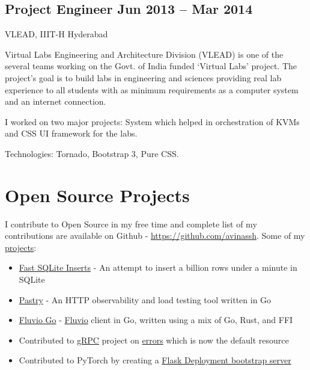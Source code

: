 \documentclass[a4,10pt]{article}
\newcommand{\subtext}[1]{
#1\par\vspace{-0.2cm}}
\newenvironment{zitemize}{
\begin{itemize}\itemsep0pt \parskip0pt \parsep1pt}
{\end{itemize}\vspace{-0.5cm}}
\begin{document}
\subsection*{Project Engineer \hfill Jun 2013 – Mar 2014} 
\subtext{VLEAD, IIIT-H \hfill Hyderabad} 
\begin{flushleft}
Virtual Labs Engineering and Architecture Division (VLEAD) is one of the several teams working on the Govt. of India funded ‘Virtual Labs’ project. The project’s goal is to build labs in engineering and sciences providing real lab experience to all students with as minimum requirements as a computer system and an internet connection.
\end{flushleft}
\begin{flushleft}
I worked on two major projects: System which helped in orchestration of KVMs and CSS UI framework for the labs.
\end{flushleft}
\begin{flushleft}
Technologies: Tornado, Bootstrap 3, Pure CSS.
\end{flushleft}


\section{Open Source Projects}
\begin{flushleft}
I contribute to Open Source in my free time and complete list of my contributions are available on Github - {\href{https://github.com/avinassh}{https://github.com/avinassh}}. Some of my {\href{https://avi.im/blag/projects/}{projects}}:
\end{flushleft}
    \begin{zitemize}
        \item {\href{https://github.com/avinassh/fast-sqlite3-inserts}{Fast SQLite Inserts}} - An attempt to insert a billion rows under a minute in SQLite
        \item {\href{https://github.com/avinassh/pastry}{Pastry}} - An HTTP observability and load testing tool written in Go
        \item {\href{https://github.com/avinassh/fluvio-go}{Fluvio Go}} - {\href{https://www.fluvio.io}{Fluvio}} client in Go, written using a mix of Go, Rust, and FFI
        \item Contributed to {\href{https://grpc.io/}{gRPC}} project on {\href{https://avi.im/grpc-errors/}{errors}} which is now the default resource 
        \item Contributed to PyTorch by creating a  {\href{https://pytorch.org/tutorials/intermediate/flask_rest_api_tutorial.html}{Flask Deployment bootstrap server}}
    \end{zitemize}
\end{document}
